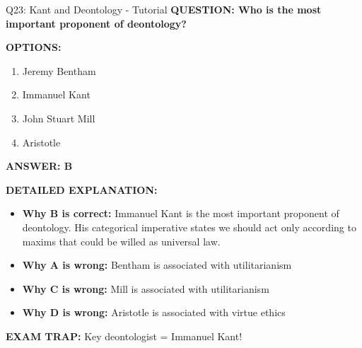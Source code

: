 \documentclass[8pt]{beamer}
\begin{document}
	\begin{frame}{Q23: Kant and Deontology - Tutorial}
		\fontsize{6.5}{7.5}\selectfont
		\textbf{QUESTION: Who is the most important proponent of deontology?}
		
		\vspace{0.1cm}
		\textbf{OPTIONS:}
		\begin{enumerate}
			\item Jeremy Bentham
			\item Immanuel Kant
			\item John Stuart Mill
			\item Aristotle
		\end{enumerate}
		
		\vspace{0.1cm}
		\textcolor{myblue}{\textbf{ANSWER: B}}
		
		\vspace{0.1cm}
		\textbf{DETAILED EXPLANATION:}
		\begin{itemize}
			\item \textbf{Why B is correct:} Immanuel Kant is the most important proponent of deontology. His categorical imperative states we should act only according to maxims that could be willed as universal law.
			\item \textbf{Why A is wrong:} Bentham is associated with utilitarianism
			\item \textbf{Why C is wrong:} Mill is associated with utilitarianism
			\item \textbf{Why D is wrong:} Aristotle is associated with virtue ethics
		\end{itemize}
		
		\textcolor{myred}{\textbf{EXAM TRAP:}} Key deontologist = \textcolor{myblue}{Immanuel Kant}!
	\end{frame}
	
\end{document}
